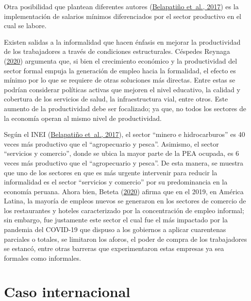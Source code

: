 \documentclass[
  letterpaper,
  12pt,
  oneside,
  spanish,
  doublespacing,
  headsepline,
  parskip]{MastersDoctoralThesis}
\begin{document}
Otra posibilidad que plantean diferentes autores
(\protect\hyperlink{ref-belapatiuxf1o2017}{Belapatiño et~al., 2017}) es
la implementación de salarios mínimos diferenciados por el sector
productivo en el cual se labore.

Existen salidas a la informalidad que hacen énfasis en mejorar la
productividad de los trabajadores a través de condiciones estructurales.
Céspedes Reynaga (\protect\hyperlink{ref-cuxe9spedesreynaga2020}{2020})
argumenta que, si bien el crecimiento económico y la productividad del
sector formal empuja la generación de empleo hacia la formalidad, el
efecto es mínimo por lo que se requiere de otras soluciones más
directas. Entre estas se podrían considerar políticas activas que
mejoren el nivel educativo, la calidad y cobertura de los servicios de
salud, la infraestructura vial, entre otros. Este aumento de la
productividad debe ser focalizado; ya que, no todos los sectores de la
economía operan al mismo nivel de productividad.

Según el INEI (\protect\hyperlink{ref-belapatiuxf1o2017}{Belapatiño
et~al., 2017}), el sector ``minero e hidrocarburos'' es 40 veces más
productivo que el ``agropecuario y pesca''. Asimismo, el sector
``servicios y comercio'', donde se ubica la mayor parte de la PEA
ocupada, es 6 veces más productivo que el ``agropecuario y pesca''. De
esta manera, se muestra que uno de los sectores en que es más urgente
intervenir para reducir la informalidad es el sector ``servicios y
comercio'' por su predominancia en la economía peruana. Ahora bien,
Beteta (\protect\hyperlink{ref-beteta2020}{2020}) afirma que en el 2019,
en América Latina, la mayoría de empleos nuevos se generaron en los
sectores de comercio de los restaurantes y hoteles caracterizado por la
concentración de empleo informal; sin embargo, fue justamente este
sector el cual fue el más impactado por la pandemia del COVID-19 que
dispuso a los gobiernos a aplicar cuarentenas parciales o totales, se
limitaron los aforos, el poder de compra de los trabajadores se estancó,
entre otras barreras que experimentaron estas empresas ya sea formales
como informales.

\hypertarget{caso-internacional}{%
\section{Caso internacional}\label{caso-internacional}}
\end{document}
